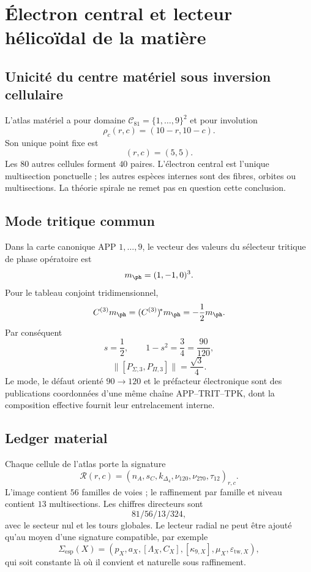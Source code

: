 \chapter{Électron central et lecteur hélicoïdal de la matière}

\section{Unicité du centre matériel sous inversion cellulaire}

L'atlas matériel a pour domaine \(\mathcal C_{81}=\{1,\ldots,9\}^2\) et pour involution
\[
 \rho_c(r,c)=(10-r,10-c).
\]
Son unique point fixe est
\[
 (r,c)=(5,5).
\]
Les \(80\) autres cellules forment \(40\) paires. L'électron central est l'unique multisection ponctuelle ; les autres espèces internes sont des fibres, orbites ou multisections. La théorie spirale ne remet pas en question cette conclusion.

\section{Mode tritique commun}

Dans la carte canonique APP \(1,\ldots,9\), le vecteur des valeurs du sélecteur tritique de phase opératoire est
\[
 m_{\ph}=(1,-1,0)^3.
\]
Pour le tableau conjoint tridimensionnel,
\[
 C^{(3)}m_{\ph}=(C^{(3)})^{\!*}m_{\ph}
 =-\frac12m_{\ph}.
\]
Par conséquent
\[
 s=\frac12,\qquad
 1-s^2=\frac34=\frac{90}{120},
\]
\begin{equation}
 \|[P_{\Sigma,3},P_{\Pi,3}]\|
 =\frac{\sqrt3}{4}.
 \label{espiral:eq:modo-electron-app}
\end{equation}
Le mode, le défaut orienté \(90\to120\) et le préfacteur électronique sont des publications coordonnées d'une même chaîne APP--TRIT--TPK, dont la composition effective fournit leur entrelacement interne.

\section{Ledger material}

Chaque cellule de l'atlas porte la signature
\[
 \mathcal R(r,c)=
 (n_A,s_C,k_{\Delta_4},\nu_{120},\nu_{270},\tau_{12})_{r,c}.
\]
L'image contient \(56\) familles de voies ; le raffinement par famille et niveau contient \(13\) multisections. Les chiffres directeurs sont
\[
 81/56/13/324,
\]
avec le secteur nul et les tours globales. Le lecteur radial ne peut être ajouté qu'au moyen d'une signature compatible, par exemple
\[
 \Sigma_{\mathrm{esp}}(X)=
 (p_X,a_X,[\Lambda_X,C_X],
 [\kappa_{9,X}],\mu_X,\varepsilon_{{\mathrm{tw}},X}),
\]
qui soit constante là où il convient et naturelle sous raffinement.


